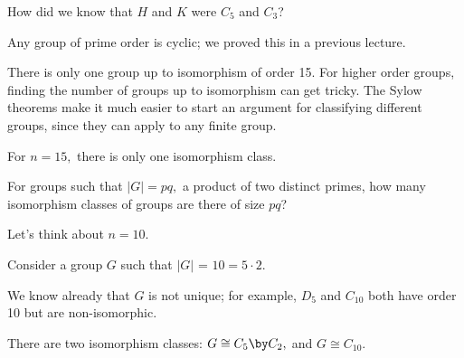 \begin{question}
How did we know that $H$ and $K$ were $C_5$ and $C_3$?

\end{question}
\begin{ans}
Any group of prime order is cyclic; we proved this in a previous lecture.
\end{ans}

There is only one group up to isomorphism of order 15. For higher order groups, finding the number of groups up to isomorphism can get tricky. The Sylow theorems make it much easier to start an argument for classifying different groups, since they can apply to any finite group. 

For $n = 15,$ there is only one isomorphism class. 

\begin{qq}
For groups such that $|G| = pq,$ a product of two distinct primes, how many isomorphism classes of groups are there of size $pq$?
\end{qq}

Let's think about $n = 10.$

\begin{example}
Consider a group $G$ such that $|G|$ = $10 = 5 \cdot 2.$

\end{example} 

We know already that $G$ is not unique; for example, $D_5$ and $C_{10}$ both have order 10 but are non-isomorphic.

\begin{proposition}
There are two isomorphism classes: $G \cong C_5 \by C_2,$ and $G \cong C_{10}.$
\end{proposition}

